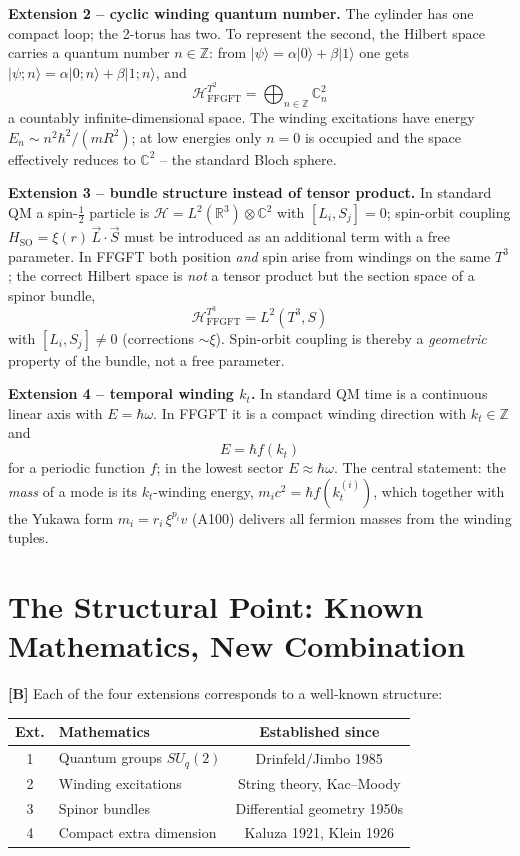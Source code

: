 \textbf{Extension 2 -- cyclic winding quantum number.} The cylinder has one compact
loop; the 2-torus has two. To represent the second, the Hilbert space carries a
quantum number $n\in\mathbb{Z}$: from $|\psi\rangle = \alpha|0\rangle+\beta|1\rangle$
one gets $|\psi;n\rangle = \alpha|0;n\rangle+\beta|1;n\rangle$, and
\[
  \boxed{\;\mathcal{H}^{T^2}_{\text{FFGFT}} = \bigoplus_{n\in\mathbb{Z}}\mathbb{C}^2_n\;}
\]
a countably infinite-dimensional space. The winding excitations have energy
$E_n\sim n^2\hbar^2/(mR^2)$; at low energies only $n=0$ is occupied and the space
effectively reduces to $\mathbb{C}^2$ -- the standard Bloch sphere.

\textbf{Extension 3 -- bundle structure instead of tensor product.} In standard
QM a spin-$\tfrac12$ particle is $\mathcal{H} = L^2(\mathbb{R}^3)\otimes\mathbb{C}^2$
with $[L_i,S_j]=0$; spin-orbit coupling $H_{\text{SO}}=\xi(r)\,\vec L\cdot\vec S$
must be introduced as an additional term with a free parameter. In FFGFT both
position \emph{and} spin arise from windings on the same $T^3$; the correct
Hilbert space is \emph{not} a tensor product but the section space of a spinor
bundle,
\[
  \boxed{\;\mathcal{H}^{T^3}_{\text{FFGFT}} = L^2(T^3, S)\;}
\]
with $[L_i,S_j]\neq0$ (corrections $\sim\xi$). Spin-orbit coupling is thereby a
\emph{geometric} property of the bundle, not a free parameter.

\textbf{Extension 4 -- temporal winding $k_t$.} In standard QM time is a
continuous linear axis with $E=\hbar\omega$. In FFGFT it is a compact winding
direction with $k_t\in\mathbb{Z}$ and
\[
  \boxed{\;E = \hbar f(k_t)\;}
\]
for a periodic function $f$; in the lowest sector $E\approx\hbar\omega$. The
central statement: the \emph{mass} of a mode is its $k_t$-winding energy,
$m_i c^2 = \hbar f(k_t^{(i)})$, which together with the Yukawa form
$m_i = r_i\,\xi^{p_i}v$ (A100) delivers all fermion masses from the winding
tuples.

\section{The Structural Point: Known Mathematics, New Combination}

\textbf{[B]} Each of the four extensions corresponds to a well-known structure:

\begin{center}
\renewcommand{\arraystretch}{1.4}
{\small
\begin{tabular}{clc}
\toprule
\textbf{Ext.} & \textbf{Mathematics} & \textbf{Established since} \\
\midrule
1 & Quantum groups $SU_q(2)$ & Drinfeld/Jimbo 1985 \\
2 & Winding excitations & String theory, Kac--Moody \\
3 & Spinor bundles & Differential geometry 1950s \\
4 & Compact extra dimension & Kaluza 1921, Klein 1926 \\
\bottomrule
\end{tabular}
}
\renewcommand{\arraystretch}{1.0}
\end{center}

